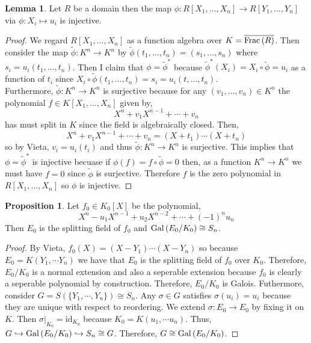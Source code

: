 \documentclass[12pt]{extarticle}
\newcommand{\id}{\mathrm{id}}
\theoremstyle{definition}
\newtheorem{lemma}[theorem]{Lemma}
\newtheorem{proposition}[theorem]{Proposition}
\begin{document}
\begin{lemma}
Let $R$ be a domain then the map $\phi : R[X_1, \dots, X_n] \to R[Y_1, \dots, Y_n]$ via $\phi : X_i \mapsto u_i$ is injective.
\end{lemma}

\begin{proof}
We regard $R[X_1, \dots, X_n]$ as a function algebra over $K = \overline{\mathrm{Frac}\left( R \right)}$. Then consider the map $\tilde{\phi} : K^n \to K^n$ by $\tilde{\phi}(t_1, \dots, t_n) =  (s_1, \dots, s_n)$ where $s_i = u_i(t_1, \dots, t_n)$. Then I claim that $\phi = \tilde{\phi}^*$ because $\tilde{\phi}^*(X_i) = X_i \circ \tilde{\phi} = u_i$ as a function of $t_i$ since $X_i \circ \tilde{\phi}(t_1, \dots, t_n) = s_i = u_i(t, \dots, t_n)$. 
\bigskip\\
Furthermore, $\tilde{\phi} : K^n \to K^n$ is surjective because for any $(v_1, \dots, v_n) \in K^n$ the polynomial $f \in K[X_1, \dots, X_n]$ given by,
\[ X^n + v_1 X^{n-1} + \cdots + v_n \]
has must split in $K$ since the field is algebraically closed. Then,
\[  X^n + v_1 X^{n-1} + \cdots + v_n = (X + t_1) \cdots (X + t_n) \]
so by Vieta, $v_i = u_i(t_i)$ and thus $\tilde{\phi} : K^n \to K^n$ is surjective. This implies that $\phi = \tilde{\phi}^*$ is injective becuase if $\phi(f) = f \circ \tilde{\phi} = 0$ then, as a function $K^n \to K^n$ we must have $f = 0$ since $\tilde{\phi}$ is surjective. Therefore $f$ is the zero polynomial in $R[X_1, \dots, X_n]$ so $\phi$ is injective.
\end{proof}


\begin{proposition}
Let $f_0 \in K_0[X]$ be the polynomial,
\[ X^n - u_1 X^{n-1} + u_2 X^{n-2} + \cdots + (-1)^n u_n \]
Then $E_0$ is the splitting field of $f_0$ and $\mathrm{Gal}\left( E_0/K_0 \right) \cong S_n$.
\end{proposition}

\begin{proof}
By Vieta, $f_0(X) = (X - Y_1) \cdots (X - Y_n)$ so because $E_0 = K(Y_1, \cdots Y_n)$ we have that $E_0$ is the splitting field of $f_0$ over $K_0$. Therefore, $E_0 / K_0$ is a normal extension and also a seperable extension because $f_0$ is clearly a seperable polynomial by construction. Therefore, $E_0/K_0$ is Galois. Futhermore, consider $G =  S(\{Y_1, \cdots, Y_n\}) \cong S_n$. Any $\sigma \in G$ satisfies $\sigma(u_i) = u_i$ because they are unique with respect to reordering. We extend $\sigma : E_0 \to E_0$ by fixing it on $K$. Then $\sigma|_{K_0} = \id_{K_0}$ because $K_0 = K(u_1, \cdots u_n)$. Thus, $G \hookrightarrow \mathrm{Gal}\left( E_0/K_0 \right) \hookrightarrow S_n \cong G$. Therefore, $G \cong \mathrm{Gal}\left( E_0/K_0 \right)$. 
\end{proof}
\end{document}
